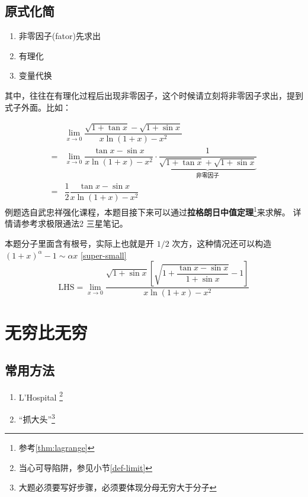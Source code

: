 \subsection{原式化简}
\begin{enumerate}
	\item 非零因子(fator)先求出 \label{non-zero-factor}
	\item 有理化
	\item 变量代换
\end{enumerate}

其中，往往在有理化过程后出现非零因子，这个时候请立刻将非零因子求出，提到式子外面。比如：

\begin{example}
    \label{ex:limit-simplify-and-sqrt-substitution-example-1}
    \begin{align*}
        &\lim_{x \to 0} \dfrac{\sqrt{1+\tan{x}} - \sqrt{1+\sin{x}}}{x \ln{(1+x)} - x^2} \\
        =&\lim_{x \to 0} \dfrac{\tan{x} - \sin{x}}{x \ln{(1+x)} - x^2} \cdot
        \underbrace{\dfrac{1}{\sqrt{1+\tan{x}} + \sqrt{1+\sin{x}}}}_{\mbox{非零因子}}\\
        =&\dfrac{1}{2} \dfrac{\tan{x} - \sin{x}}{x \ln{(1+x)} - x^2}
    \end{align*}
    例题选自武忠祥强化课程，本题目接下来可以通过\textbf{拉格朗日中值定理}\footnote{参考\ref{thm:lagrange}}来求解。
    详情请参考求极限通法2 三星笔记。

    本题分子里面含有根号，实际上也就是开 $1/2$ 次方，这种情况还可以构造
    $(1+x)^\alpha - 1 \sim \alpha x$
    \ref{super-small}
    \begin{equation*}
        \mbox{LHS} = \lim_{x \to 0}
        \dfrac{\sqrt{1+\sin{x}}\left[ 
            \sqrt{1+\dfrac{\tan{x}-\sin{x}}{1+\sin{x}}}	- 1
            \right] }{x \ln{(1+x)} - x^2}
    \end{equation*}
\end{example}

\section{无穷比无穷}

\subsection{常用方法}

\begin{enumerate}
    \item L'Hospital \footnote{当心可导陷阱，参见小节\ref{def-limit}}
	\item “抓大头”\footnote{大题必须要写好步骤，必须要体现分母无穷大于分子}
\end{enumerate}

